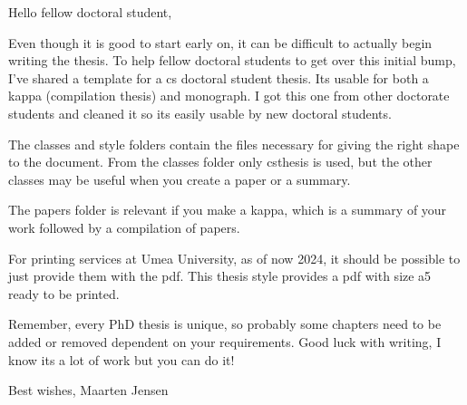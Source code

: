 Hello fellow doctoral student,

Even though it is good to start early on, it can be difficult to actually begin writing the thesis. To help fellow doctoral students to get over this initial bump, I've shared a template for a cs doctoral student thesis. Its usable for both a kappa (compilation thesis) and monograph. I got this one from other doctorate students and cleaned it so its easily usable by new doctoral students. 

The classes and style folders contain the files necessary for giving the right shape to the document. From the classes folder only csthesis is used, but the other classes may be useful when you create a paper or a summary.

The papers folder is relevant if you make a kappa, which is a summary of your work followed by a  compilation of papers.

For printing services at Umea University, as of now 2024, it should be possible to just provide them with the pdf. This thesis style provides a pdf with size a5 ready to be printed.

Remember, every PhD thesis is unique, so probably some chapters need to be added or removed dependent on your requirements. Good luck with writing, I know its a lot of work but you can do it!

Best wishes,
Maarten Jensen